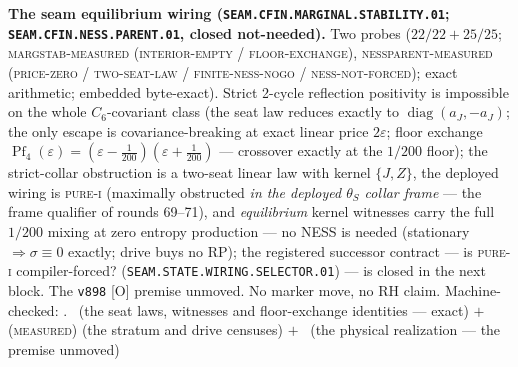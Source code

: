 \documentclass[11pt,a4paper]{article}
\theoremstyle{definition}
\begin{document}
\par\smallskip\noindent\textbf{The seam equilibrium wiring
(\texttt{SEAM.CFIN.MARGINAL.\allowbreak STABILITY.01};
\texttt{SEAM.CFIN.NESS.\allowbreak PARENT.01}, closed
not-needed).}
Two probes ($22/22 + 25/25$; \textsc{margstab-measured
(interior-empty / floor-exchange)}, \textsc{nessparent-measured
(price-zero / two-seat-law / finite-ness-nogo /
ness-not-forced)}; exact arithmetic; embedded byte-exact).
Strict 2-cycle reflection positivity is impossible on the whole
$C_6$-covariant class (the seat law reduces exactly to
$\operatorname{diag}(a_J, -a_J)$; the only escape is
covariance-breaking at exact linear price $2\varepsilon$; floor
exchange $\operatorname{Pf}_4(\varepsilon) = (\varepsilon -
\tfrac1{200})(\varepsilon + \tfrac1{200})$ --- crossover
exactly at the $1/200$ floor); the strict-collar obstruction is
a two-seat linear law with kernel $\{J, Z\}$, the deployed
wiring is \textsc{pure-i} (maximally obstructed \emph{in the
deployed $\theta_S$ collar frame} --- the frame qualifier of
rounds 69--71), and
\emph{equilibrium} kernel witnesses carry the full $1/200$
mixing at zero entropy production --- no NESS is needed
(stationary $\Rightarrow \sigma \equiv 0$ exactly; drive buys
no RP); the registered successor contract --- is
\textsc{pure-i} compiler-forced?
(\texttt{SEAM.STATE.WIRING.SELECTOR.01}) --- is closed in the
next block.  The \texttt{v898}
[O] premise unmoved.  No marker move, no RH claim.
Machine-checked: .
\mE\ (the seat laws, witnesses and floor-exchange identities
--- exact) $+$ (\textsc{measured}) (the stratum and drive
censuses) $+$ \mO\ (the physical realization --- the premise
unmoved)
\par\smallskip
\end{document}
